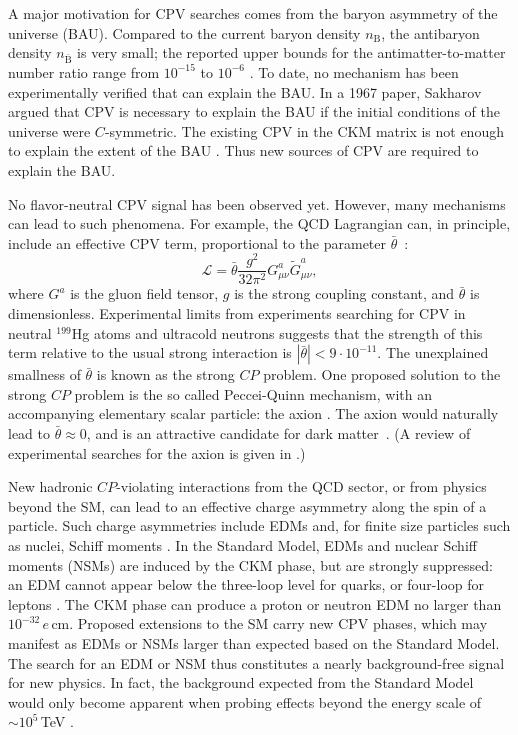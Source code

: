 A major motivation for CPV searches comes from the baryon asymmetry of the universe (BAU). Compared to the current baryon density $n_{\text{B}}$, the antibaryon density $n_{\overline{\text{B}}}$ is very small; the reported upper bounds for the antimatter-to-matter number ratio range from $10^{-15}$ to $10^{-6}$ \cite{canetti2012matter}. To date, no mechanism has been experimentally verified that can explain the BAU. In a 1967 paper, Sakharov argued that CPV is necessary to explain the BAU \cite{sakharov1991violation} if the initial conditions of the universe were $C$-symmetric. The existing CPV in the CKM matrix is not enough to explain the extent of the BAU \cite{pospelov2005electric}. Thus new sources of CPV are required to explain the BAU.

No flavor-neutral CPV signal has been observed yet. However, many mechanisms can lead to such phenomena. For example, the QCD Lagrangian can, in principle, include an effective CPV term, proportional to the parameter $\bar{\theta}$~\cite{pospelov1999theta}:
\begin{equation}
	\mathcal{L} = \bar{\theta}\frac{g^2}{32\pi^2}G^a_{\mu\nu}\widetilde{G}^a_{\mu\nu},
\end{equation}
where $G^a$ is the gluon field tensor, $g$ is the strong coupling constant, and $\bar{\theta}$ is dimensionless. Experimental limits from experiments searching for CPV in neutral $^{199}$Hg atoms \cite{graner2016reduced} and ultracold neutrons \cite{baker2006improved, abel2020measurement} suggests that the strength of this term relative to the usual strong interaction is $\left|\bar{\theta}\right|<9\cdot10^{-11}$. The unexplained smallness of $\bar{\theta}$ is known as the strong $CP$ problem. One proposed solution to the strong $CP$ problem is the so called Peccei-Quinn mechanism, with an accompanying elementary scalar particle: the axion \cite{PhysRevLett.38.1440}. The axion would naturally lead to $\bar{\theta}\approx 0$, and is an attractive candidate for dark matter~\cite{PRESKILL1983127,PhysRevLett.50.925,PhysRevLett.124.101303}. (A review of experimental searches for the axion is given in \cite{graham2015experimental}.)

New hadronic $CP$-violating interactions from the QCD sector, or from physics beyond the SM, can lead to an effective charge asymmetry along the spin of a particle. Such charge asymmetries include EDMs and, for finite size particles such as nuclei, Schiff moments \cite{schiff1963measurability}. In the Standard Model, EDMs and nuclear Schiff moments (NSMs) are induced by the CKM phase, but are strongly suppressed: an EDM cannot appear below the three-loop level for quarks, or four-loop for leptons \cite{pospelov1991electric}. The CKM phase can produce a proton or neutron EDM no larger than $10^{-32}\,e\,$cm. Proposed extensions to the SM carry new CPV phases, which may manifest as EDMs or NSMs larger than expected based on the Standard Model. The search for an EDM or NSM thus constitutes a nearly background-free signal for new physics. In fact, the background expected from the Standard Model would only become apparent when probing effects beyond the energy scale of $\sim\!10^{5}\,$TeV \cite{pospelov2005electric}.

